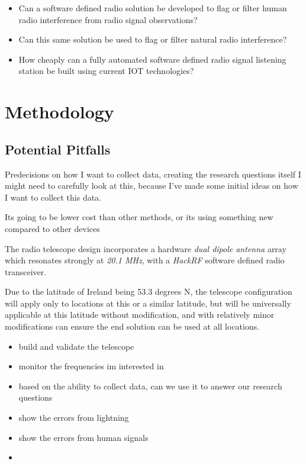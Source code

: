 \documentclass[runningheads,a4paper]{llncs}
\begin{document}
\begin{itemize}
  \item Can a software defined radio solution be developed to flag or filter human radio interference from radio signal observations?
  \item Can this same solution be used to flag or filter natural radio interference?
  \item How cheaply can a fully automated software defined radio signal listening station be built using current IOT technologies?
\end{itemize}


%
%
\newpage
\section*{Methodology}

\subsection*{Potential Pitfalls}
Predecisions on how I want to collect data, creating the research questions itself I might need to carefully look at this, because I've made some initial ideas on how I want to collect this data.

Its going to be lower cost than other methods, or its using something new compared to other devices

The radio telescope design incorporates a hardware \textit{dual dipole antenna} array which resonates strongly at \textit{20.1 MHz}, with a \textit{HackRF} software defined radio transceiver. 

Due to the latitude of Ireland being 53.3 degrees N, the telescope configuration will apply only to locations at this or a similar latitude, but will be universally applicable at this latitude without modification, and with relatively minor modifications can ensure the end solution can be used at all locations. \cite{kivelson96}

\begin{itemize}
  \item build and validate the telescope
  \item monitor the frequencies im interested in
  \item based on the ability to collect data, can we use it to answer our research questions
  \item show the errors from lightning
  \item show the errors from human signals
  \item 
\end{itemize}
\end{document}
